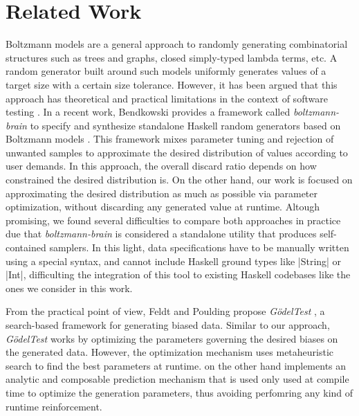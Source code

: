 \section{Related Work}


%
%
Boltzmann models \cite{Duchon2004} are a general approach to randomly generating
combinatorial structures such as trees and graphs, closed simply-typed lambda
terms, etc.
%
A random generator built around such models uniformly generates values of a
target size with a certain size tolerance.
%
However, it has been argued that this approach has theoretical and practical
limitations in the context of software testing \cite{feldt2013}.
%
In a recent work, Bendkowski provides a framework called \emph{boltzmann-brain}
to specify and synthesize standalone Haskell random generators based on
Boltzmann models \cite{bendkowski2018}.
%
This framework mixes parameter tuning and rejection of unwanted samples to
approximate the desired distribution of values according to user demands.
%
In this approach, the overall discard ratio depends on how constrained the
desired distribution is.
%
On the other hand, our work is focused on approximating the desired distribution
as much as possible via parameter optimization, without discarding any generated
value at runtime.
%
Altough promising, we found several difficulties to compare both approaches in
practice due that \emph{boltzmann-brain} is considered a standalone utility that
produces self-contained samplers.
%
In this light, data specifications have to be manually written using a special
syntax, and cannot include Haskell ground types like |String| or |Int|,
difficulting the integration of this tool to existing Haskell codebases like the
ones we consider in this work.



%
%
From the practical point of view, Feldt and Poulding propose \emph{G\"odelTest}
\cite{feldt2013}, a search-based framework for generating biased data.
%
%
Similar to our approach, \emph{G\"odelTest} works by optimizing the parameters
governing the desired biases on the generated data.
%
However, the optimization mechanism uses metaheuristic search to find the best
parameters at runtime.
%
\dragenp on the other hand implements an analytic and composable prediction
mechanism that is used only used at compile time to optimize the generation
parameters, thus avoiding perfomring any kind of runtime reinforcement.


